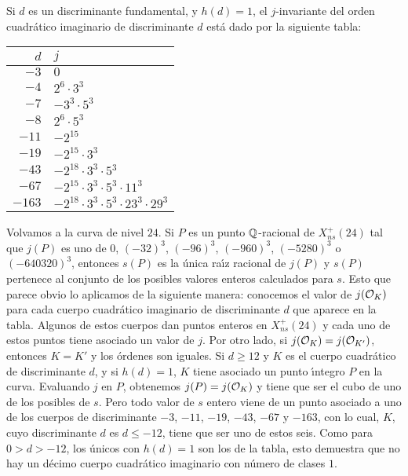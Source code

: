 Si $d$ es un discriminante fundamental, y $h(d)=1$, el $j$-invariante del orden
cuadr\'{a}tico imaginario de discriminante $d$ est\'{a} dado por la siguiente
tabla:

\begin{tabular}[b]{r|l}
 $d$ & $j$\\%
 \hline
 $-3$ & $0$\\%
 $-4$ & $2^{6}\cdot 3^{3}$\\%
 $-7$ & $-3^{3}\cdot 5^{3}$\\%
 $-8$ & $2^{6}\cdot 5^{3}$\\%
 $-11$ & $-2^{15}$\\%
 $-19$ & $-2^{15}\cdot 3^{3}$\\%
 $-43$ & $-2^{18}\cdot 3^{3}\cdot 5{^3}$\\%
 $-67$ & $-2^{15}\cdot 3^{3}\cdot 5^{3}\cdot 11^{3}$\\%
 $-163$ & $-2^{18}\cdot 3^{3}\cdot 5^{3}\cdot 23^{3}\cdot 29^{3}$\\%
\end{tabular}

Volvamos a la curva de nivel $24$.
Si $P$ es un punto $\bb{Q}$-racional de $X_{ns}^{+}(24)$ tal que $j(P)$ es uno
de $0$, $(-32)^{3}$, $(-96)^{3}$, $(-960)^{3}$,
$(-5280)^{3}$ o $(-640320)^{3}$, entonces $s(P)$ es la \'{u}nica ra\'{\i}z
racional de $j(P)$ y $s(P)$ pertenece al conjunto de los posibles valores
enteros calculados para $s$. Esto que parece obvio lo aplicamos de la siguiente
manera: conocemos el valor de $j(\cal{O}_{K})$ para cada cuerpo cuadr\'{a}tico
imaginario de discriminante $d$ que aparece en la tabla. Algunos de estos cuerpos
dan puntos enteros en $X_{ns}^{+}(24)$ %
y cada uno de estos puntos tiene asociado un valor de $j$. Por otro lado, si
$j(\cal{O}_{K})=j(\cal{O}_{K'})$, entonces $K=K'$ y los \'{o}rdenes son iguales.
Si $d\geq 12$ y $K$ es el cuerpo cuadr\'{a}tico de discriminante $d$, y si
$h(d)=1$, $K$ tiene asociado un punto \'{\i}ntegro $P$ en la curva.
Evaluando $j$ en $P$, obtenemos $j(P)=j(\cal{O}_{K})$ y tiene que ser el cubo de
uno de los posibles de $s$. Pero todo valor de $s$ entero viene de un punto
asociado a uno de los cuerpos de discriminante $-3$, $-11$, $-19$, $-43$, $-67$
y $-163$, con lo cual, $K$, cuyo discriminante $d$ es $d\leq -12$,
tiene que ser uno de estos seis. Como para $0>d>-12$, los \'{u}nicos con
$h(d)=1$ son los de la tabla, esto demuestra que no hay un d\'{e}cimo cuerpo
cuadr\'{a}tico imaginario con n\'{u}mero de clases $1$.


